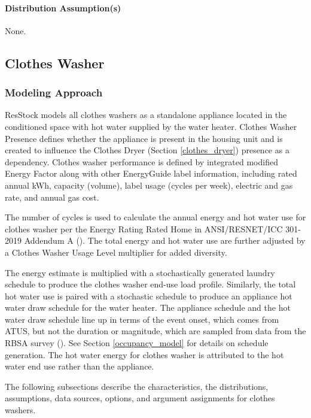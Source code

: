\paragraph{Distribution Assumption(s)}
None.

\subsection{Clothes Washer}
\subsubsection{Modeling Approach}
ResStock models all clothes washers as a standalone appliance located in the conditioned space with hot water supplied by the water heater. Clothes Washer Presence defines whether the appliance is present in the housing unit and is created to influence the Clothes Dryer (Section \ref{clothes_dryer}) presence as a dependency. Clothes washer performance is defined by integrated modified Energy Factor along with other EnergyGuide label information, including rated annual kWh, capacity (volume), label usage (cycles per week), electric and gas rate, and annual gas cost. 

The number of cycles is used to calculate the annual energy and hot water use for clothes washer per the Energy Rating Rated Home in ANSI/RESNET/ICC 301-2019 Addendum A (\cite{ansi_resnet_301_2019}). The total energy and hot water use are further adjusted by a Clothes Washer Usage Level multiplier for added diversity. 

The energy estimate is multiplied with a stochastically generated laundry schedule to produce the clothes washer end-use load profile. Similarly, the total hot water use is paired with a stochastic schedule to produce an appliance hot water draw schedule for the water heater. The appliance schedule and the hot water draw schedule line up in terms of the event onset, which comes from ATUS, but not the duration or magnitude, which are sampled from data from the RBSA survey (\cite{RBSA}). See Section \ref{occupancy_model} for details on schedule generation. The hot water energy for clothes washer is attributed to the hot water end use rather than the appliance.

The following subsections describe the characteristics, the distributions, assumptions, data sources, options, and argument assignments for clothes washers.

